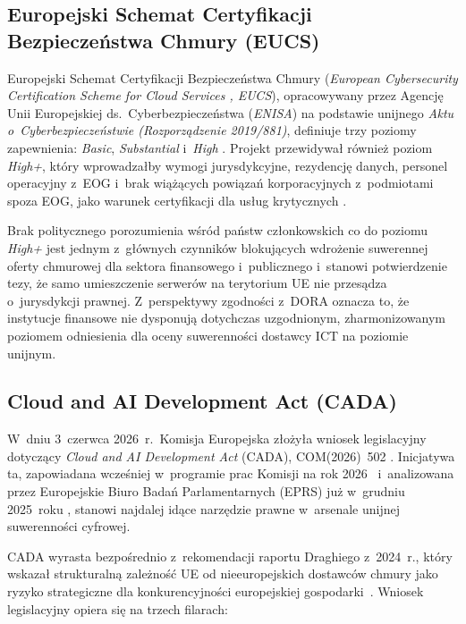 \subsection*{Europejski Schemat Certyfikacji Bezpieczeństwa Chmury (EUCS)}

Europejski Schemat Certyfikacji Bezpieczeństwa Chmury (\textit{European
Cybersecurity Certification Scheme for Cloud Services , EUCS}), opracowywany
przez Agencję Unii Europejskiej ds.\ Cyberbezpieczeństwa (\textit{ENISA}) na podstawie
unijnego \textit{Aktu o~Cyberbezpieczeństwie (Rozporządzenie 2019/881)}, definiuje
trzy poziomy zapewnienia: \textit{Basic}, \textit{Substantial} i~\textit{High}
\autocite{enisa_eucs2022}. Projekt przewidywał również poziom
\textit{High+}, który wprowadzałby wymogi jurysdykcyjne, rezydencję
danych, personel operacyjny z~EOG i~brak wiążących powiązań korporacyjnych
z~podmiotami spoza EOG, jako warunek certyfikacji dla usług krytycznych
\autocite{enisa_eucs2022}.

Brak politycznego porozumienia wśród państw członkowskich co do poziomu
\textit{High+} jest jednym z~głównych czynników blokujących wdrożenie
suwerennej oferty chmurowej dla sektora finansowego i~publicznego i~stanowi
potwierdzenie tezy, że samo umieszczenie serwerów na terytorium UE nie
przesądza o~jurysdykcji prawnej. Z~perspektywy zgodności z~DORA oznacza to,
że instytucje finansowe nie dysponują dotychczas uzgodnionym,
zharmonizowanym poziomem odniesienia dla oceny suwerenności dostawcy ICT
na poziomie unijnym.

\subsection*{Cloud and AI Development Act (CADA)}

W~dniu 3~czerwca 2026~r.\ Komisja Europejska złożyła wniosek legislacyjny
dotyczący \textit{Cloud and AI Development Act} (CADA), COM(2026)~502
\autocite{cada2026}. Inicjatywa ta, zapowiadana wcześniej w~programie prac
Komisji na rok 2026~\autocite{ec_workprogramme2026} i~analizowana przez
Europejskie Biuro Badań Parlamentarnych (EPRS) już w~grudniu 2025~roku
\autocite{eprs_cada2025}, stanowi najdalej idące narzędzie prawne w~arsenale
unijnej suwerenności cyfrowej.

CADA wyrasta bezpośrednio z~rekomendacji raportu Draghiego z~2024~r.,
który wskazał strukturalną zależność UE od nieeuropejskich dostawców chmury
jako ryzyko strategiczne dla konkurencyjności europejskiej
gospodarki~\autocite{draghi2024}. Wniosek legislacyjny opiera się na
trzech filarach:

